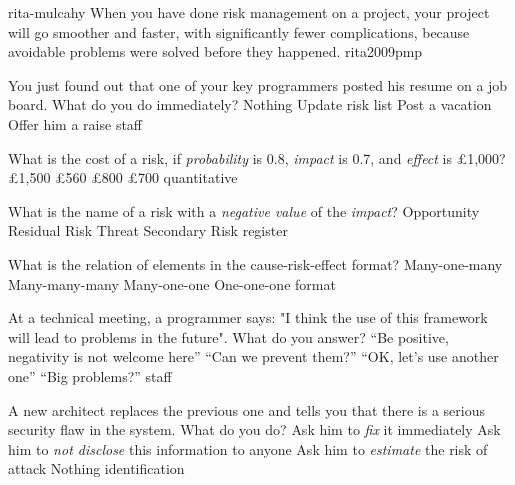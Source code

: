 \documentclass{article}
\begin{document}

\lnQuote
  {rita-mulcahy}
  {When you have done risk management on a project, your project will go smoother and faster, with significantly fewer complications, because avoidable problems were solved before they happened.}
  {rita2009pmp}


\pmbaQuestion
  {You just found out that one of your key programmers posted his resume on a job board. What do you do immediately?}
  {Nothing}
  {Update risk list}
  {Post a vacation}
  {Offer him a raise}
  {staff}

\pmbaQuestion
  {What is the cost of a risk, if \emph{probability} is 0.8, \emph{impact} is 0.7, and \emph{effect} is \pounds1,000?}
  {\pounds1,500}
  {\pounds560}
  {\pounds800}
  {\pounds700}
  {quantitative}

\pmbaQuestion
  {What is the name of a risk with a \emph{negative value} of the \emph{impact}?}
  {Opportunity}
  {Residual Risk}
  {Threat}
  {Secondary Risk}
  {register}

\pmbaQuestion
  {What is the relation of elements in the cause-risk-effect format?}
  {Many-one-many}
  {Many-many-many}
  {Many-one-one}
  {One-one-one}
  {format}

\pmbaQuestion
  {At a technical meeting, a programmer says: "I think the use of this framework will lead to problems in the future". What do you answer?}
  {``Be positive, negativity is not welcome here''} %
  {``Can we prevent them?''} %
  {``OK, let's use another one''} %
  {``Big problems?''} %
  {staff}

\pmbaQuestion
  {A new architect replaces the previous one and tells you that there is a serious security flaw in the system. What do you do?}
  {Ask him to \emph{fix} it immediately}
  {Ask him to \emph{not disclose} this information to anyone}
  {Ask him to \emph{estimate} the risk of attack}
  {Nothing}
  {identification}
\end{document}

